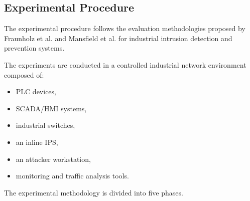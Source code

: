 \documentclass[sigconf]{acmart}
\begin{document}
\begin{table}[htbp]
\renewcommand{\tablename}{Table} 
\renewcommand{\thetable}{\arabic{table}}
\captionsetup{labelsep=period, labelfont=bf, textfont=normal, textformat=simple} 
\caption{Evaluation Variables for Attack Scenarios} 
\centering
\scriptsize
{}
\label{tab:evaluation_variables}
\end{table}


\subsection{Experimental Procedure}
The experimental procedure follows the evaluation methodologies proposed by Fraunholz et al. \cite{fraunholz2018industrial} and Mansfield et al. \cite{mansfield2020threeTier} for industrial intrusion detection and prevention systems.

The experiments are conducted in a controlled industrial network environment composed of:
\begin{itemize}
    \item PLC devices,
    \item SCADA/HMI systems,
    \item industrial switches,
    \item an inline IPS,
    \item an attacker workstation,
    \item monitoring and traffic analysis tools.
\end{itemize}

The experimental methodology is divided into five phases.
\end{document}
